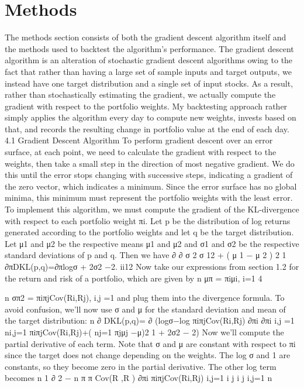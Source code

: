 \documentclass{article}
\begin{document}
\section{Methods} 
The methods section consists of both the gradient descent algorithm itself and the methods used to backtest the algorithm’s performance. The gradient descent algorithm is an alteration of stochastic gradient descent algorithms owing to the fact that rather than having a large set of sample inputs and target outputs, we instead have one target distribution and a single set of input stocks. As a result, rather than stochastically estimating the gradient, we actually compute the gradient with respect to the portfolio weights. My backtesting approach rather simply applies the algorithm every day to compute new weights, invests based on that, and records the resulting change in portfolio value at the end of each day.
4.1 Gradient Descent Algorithm
To perform gradient descent over an error surface, at each point, we need to calculate the gradient with respect to the weights, then take a small step in the direction of most negative gradient. We do this until the error stops changing with successive steps, indicating a gradient of the zero vector, which indicates a minimum. Since the error surface has no global minima, this minimum must represent the portfolio weights with the least error.
To implement this algorithm, we must compute the gradient of the KL-divergence with respect to each portfolio weight πi. Let p be the distribution of log returns generated according to the portfolio weights and let q be the target distribution. Let μ1 and μ2 be the respective means μ1 and μ2 and σ1 and σ2 be the respective standard deviations of p and q. Then we have
∂ ∂ σ 2 σ 12 + ( μ 1 − μ 2 ) 2 1 ∂πDKL(p,q)=∂πlogσ + 2σ2 −2.
ii12
Now take our expressions from section 1.2 for the return and risk of a portfolio, which are given by
n
μπ = πiμi, i=1
     4

n
σπ2 =   πiπjCov(Ri,Rj),
i,j =1
and plug them into the divergence formula. To avoid confusion, we’ll now use σ and μ for the
standard deviation and mean of the target distribution:
  n
∂ DKL(p,q)= ∂ (logσ−log   πiπjCov(Ri,Rj) ∂πi ∂πi  
i,j =1
 ni,j=1 πiπjCov(Ri,Rj)+( nj=1 πjμj −μ)2 1
+ 2σ2 − 2)
Now we’ll compute the partial derivative of each term. Note that σ and μ are constant with respect to
πi since the target does not change depending on the weights. The log σ and 1 are constants, so they
      become zero in the partial derivative. The other log term becomes
  n 1 ∂  
2
 −  n π π Cov(R ,R ) ∂πi   πiπjCov(Ri,Rj) i,j=1 i j i j i,j=1
   n
 
\end{document}
